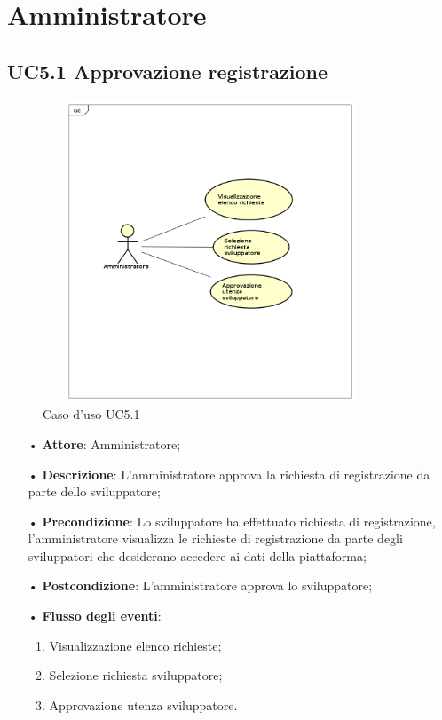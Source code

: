 \section{Amministratore}
\subsection{UC5.1 Approvazione registrazione}

\begin{figure}[H]
\centering
\includegraphics[width=10cm,height=9cm]{img/UC51.png} 
\caption{Caso d'uso UC5.1}
\end{figure}

\begin{itemize}
\item[•] \textbf{Attore}: Amministratore;

\item[•] \textbf{Descrizione}: L’amministratore approva la richiesta di registrazione da parte dello sviluppatore;

\item[•] \textbf{Precondizione}: Lo sviluppatore ha effettuato richiesta di registrazione, l'amministratore visualizza le richieste di registrazione da parte degli sviluppatori che desiderano accedere ai dati della piattaforma;

\item[•] \textbf{Postcondizione}: L’amministratore approva lo sviluppatore;

\item[•] \textbf{Flusso degli eventi}:

\begin{enumerate}

\item Visualizzazione elenco richieste;

\item Selezione richiesta sviluppatore;

\item Approvazione utenza sviluppatore.

\end{enumerate}

\end{itemize}


